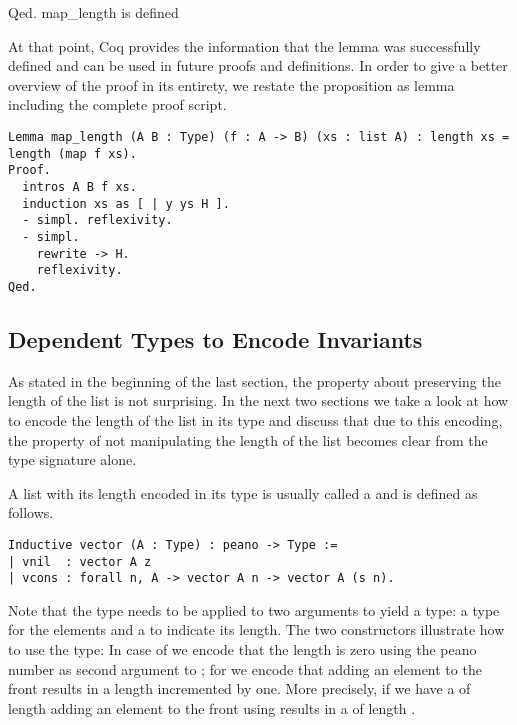 \begin{cproof}{Qed.}
map_length is defined
\end{cproof}

At that point, Coq provides the information that the lemma  was successfully defined and can be used in future proofs and definitions.
In order to give a better overview of the proof in its entirety, we restate the proposition as lemma including the complete proof script.

\begin{verbatim}
Lemma map_length (A B : Type) (f : A -> B) (xs : list A) : length xs = length (map f xs).
Proof.
  intros A B f xs.
  induction xs as [ | y ys H ].
  - simpl. reflexivity.
  - simpl.
    rewrite -> H.
    reflexivity.
Qed.
\end{verbatim}

\subsection{Dependent Types to Encode Invariants}

As stated in the beginning of the last section, the property about  preserving the length of the list is not surprising.
In the next two sections we take a look at how to encode the length of the list in its type and discuss that due to this encoding, the property of  not manipulating the length of the list becomes clear from the type signature alone.

A list with its length encoded in its type is usually called a  and is defined as follows.

\begin{verbatim}
Inductive vector (A : Type) : peano -> Type :=
| vnil  : vector A z
| vcons : forall n, A -> vector A n -> vector A (s n).
\end{verbatim}

Note that the type  needs to be applied to two arguments to yield a type: a type for the elements and a  to indicate its length.
The two constructors illustrate how to use the type: In case of  we encode that the length is zero using the peano number  as second argument to ; for  we encode that adding an element to the front results in a length incremented by one.
More precisely, if we have a  of length  adding an element to the front using  results in a  of length .

